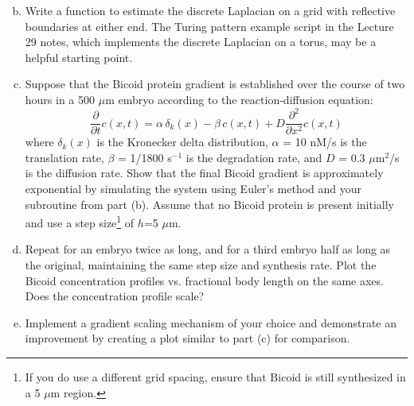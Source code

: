 \documentclass{article}
\begin{document}
\begin{enumerate}[a)]
\setcounter{enumi}{1}
\item Write a function to estimate the discrete Laplacian on a grid with reflective boundaries at either end. The Turing pattern example script in the Lecture 29 notes, which implements the discrete Laplacian on a torus, may be a helpful starting point.
\item Suppose that the Bicoid protein gradient is established over the course of two hours in a 500 $\mu$m embryo according to the reaction-diffusion equation:
\[  \frac{\partial}{\partial t} c(x,t) =  \alpha \, \delta_k(x) - \beta \, c(x,t) + D \frac{\partial^2}{\partial x^2}  c(x,t) \]
where $\delta_k(x)$ is the Kronecker delta distribution, $\alpha$ = 10 nM/s is the translation rate, $\beta$ = 1/1800 s$^{-1}$ is the degradation rate, and $D$ = 0.3 $\mu$m$^2$/s is the diffusion rate. Show that the final Bicoid gradient is approximately exponential by simulating the system using  Euler's method and your subroutine from part (b). Assume that no Bicoid protein is present initially and use a step size\footnote{If you do use a different grid spacing, ensure that Bicoid is still synthesized in a 5 $\mu$m region.} of $h$=5 $\mu$m.
\item Repeat for an embryo twice as long, and for a third embryo half as long as the original, maintaining the same step size and synthesis rate. Plot the Bicoid concentration profiles vs. fractional body length on the same axes. Does the concentration profile scale?
\item Implement a gradient scaling mechanism of your choice and demonstrate an improvement by creating a plot similar to part (c) for comparison.
\end{enumerate}
\end{document}
